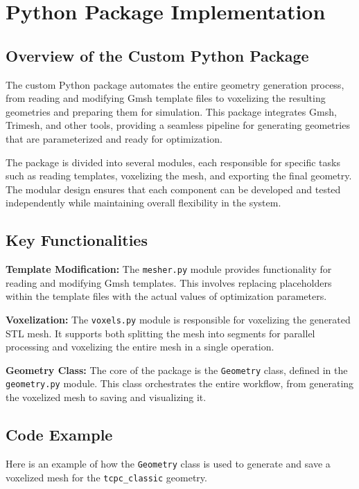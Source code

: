 \section{Python Package Implementation}

\subsection{Overview of the Custom Python Package}

The custom Python package automates the entire geometry generation process, from reading and modifying Gmsh template files to voxelizing the resulting geometries and preparing them for simulation. This package integrates Gmsh, Trimesh, and other tools, providing a seamless pipeline for generating geometries that are parameterized and ready for optimization.

The package is divided into several modules, each responsible for specific tasks such as reading templates, voxelizing the mesh, and exporting the final geometry. The modular design ensures that each component can be developed and tested independently while maintaining overall flexibility in the system.

\subsection{Key Functionalities}

\textbf{Template Modification:} The \texttt{mesher.py} module provides functionality for reading and modifying Gmsh templates. This involves replacing placeholders within the template files with the actual values of optimization parameters.


\textbf{Voxelization:} The \texttt{voxels.py} module is responsible for voxelizing the generated STL mesh. It supports both splitting the mesh into segments for parallel processing and voxelizing the entire mesh in a single operation.


\textbf{Geometry Class:} The core of the package is the \texttt{Geometry} class, defined in the \texttt{geometry.py} module. This class orchestrates the entire workflow, from generating the voxelized mesh to saving and visualizing it.


\subsection{Code Example}

Here is an example of how the \texttt{Geometry} class is used to generate and save a voxelized mesh for the \texttt{tcpc\_classic} geometry.

